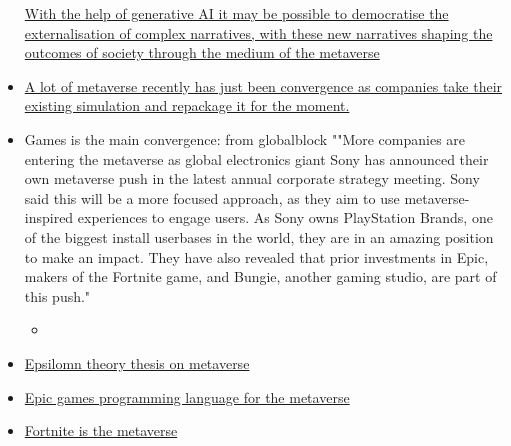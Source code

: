 \begin{itemize}
  \href{https://www.epsilontheory.com/narrative-and-metaverse-pt-3-the-luther-protocol/\#.YjyHbnLIE5k.twitter}{With
  the help of generative AI it may be possible to democratise the
  externalisation of complex narratives, with these new narratives
  shaping the outcomes of society through the medium of the metaverse}
\item
  \href{https://thedriven.io/2022/05/23/nissan-and-mitsubishi-unveil-electric-mini-vehicles-and-test-drives-in-metaverse/}{A
  lot of metaverse recently has just been convergence as companies take
  their existing simulation and repackage it for the moment.}
\item
  Games is the main convergence: from globalblock ""More companies are
  entering the metaverse as global electronics giant Sony has announced
  their own metaverse push in the latest annual corporate strategy
  meeting. Sony said this will be a more focused approach, as they aim
  to use metaverse-inspired experiences to engage users. As Sony owns
  PlayStation Brands, one of the biggest install userbases in the world,
  they are in an amazing position to make an impact. They have also
  revealed that prior investments in Epic, makers of the Fortnite game,
  and Bungie, another gaming studio, are part of this push."

  \begin{itemize}
   
  \item
  \end{itemize}
\item
  \href{https://www.epsilontheory.com/narrative-and-metaverse-pt-3-the-luther-protocol/\#.YjyHbnLIE5k.twitter}{Epsilomn
  theory thesis on metaverse}
\item
  \href{https://www.geekmetaverse.com/epic-games-launches-verse-the-metaverse-programming-language/}{Epic
  games programming language for the metaverse}
\item
  \href{https://www.ign.com/articles/how-fortnite-is-the-antidote-to-metaverse-skepticism}{Fortnite
  is the metaverse}

  \begin{itemize}
   

\end{itemize}
\end{itemize}
